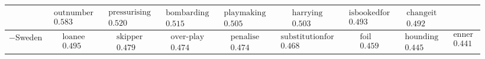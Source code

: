 \documentclass{beamer}
\begin{document}
\begin{frame}
\begin{tabular}{r|c c c c c c c c}
& $ \begin{matrix} \text{outnumber} \\ 0.583 \end{matrix}$
& $ \begin{matrix} \text{pressurising} \\ 0.520 \end{matrix}$
& $ \begin{matrix} \text{bombarding} \\ 0.515 \end{matrix}$
& $ \begin{matrix} \text{playmaking} \\ 0.505 \end{matrix}$
& $ \begin{matrix} \text{harrying} \\ 0.503 \end{matrix}$
& $ \begin{matrix} \text{isbookedfor} \\ 0.493 \end{matrix}$
& $ \begin{matrix} \text{changeit} \\ 0.492 \end{matrix}$
\\\hline
$-$Sweden
& $ \begin{matrix} \text{loanee} \\ 0.495 \end{matrix}$
& $ \begin{matrix} \text{skipper} \\ 0.479 \end{matrix}$
& $ \begin{matrix} \text{over-play} \\ 0.474 \end{matrix}$
& $ \begin{matrix} \text{penalise} \\ 0.474 \end{matrix}$
& $ \begin{matrix} \text{substitutionfor} \\ 0.468 \end{matrix}$
& $ \begin{matrix} \text{foil} \\ 0.459 \end{matrix}$
& $ \begin{matrix} \text{hounding} \\ 0.445 \end{matrix}$
& $ \begin{matrix} \text{enner} \\ 0.441 \end{matrix}$

\end{tabular}
\end{frame}
\end{document}
